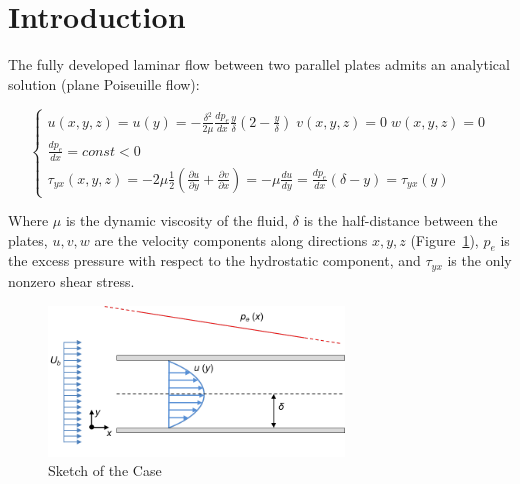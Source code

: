 \documentclass[12pt]{article}
\begin{document}
\maketitle

\begin{abstract} 
        The first test case is the steady-state development of incompressible flow between two parallel plates in the laminar regime (Figure~\\\ref{fig:sketch}). The plates are considered infinite in the direction transversal to the flow. The flow develops from a condition of uniform velocity (rectangular profile) imposed at the inlet boundary, reaching a fully-developed state at a certain distance downstream of it. \cite{FL:01}
\end{abstract}

\section{Introduction}
        The fully developed laminar flow between two parallel plates admits an analytical solution (plane Poiseuille flow):

        \begin{equation}
                \begin{cases}
                        u(x,y,z) = u(y) = - \frac{\delta ^ 2}{2 \mu} \frac{dp_e}{dx} \frac{y}{\delta} (2 - \frac{y}{\delta}) \; v(x,y,z) = 0 \; w(x,y,z) = 0 \\
                        \frac{dp_e}{dx} = const < 0 \\
                        \tau_{yx}(x,y,z) = - 2 \mu \frac{1}{2} \left( \frac{\partial u}{\partial y} + \frac{\partial v}{\partial x} \right) = - \mu \frac{du}{dy} = \frac{dp_e}{dx} (\delta - y) = \tau_{yx}(y)
                \end{cases}
        \end{equation}

        Where \( \mu \) is the dynamic viscosity of the fluid, \( \delta \) is the half-distance between the plates, \(u, v, w\) are the velocity components along directions \( x, y, z \) (Figure~\ref{fig:sketch}), \( p_e \) is the excess pressure with respect to the hydrostatic component, and \( \tau_{yx} \) is the only nonzero shear stress. \cite{FL:01}

        \begin{figure}[!ht]
                \includegraphics[width=0.7\textwidth]{Case_Sketch.png}
                \centering
                \caption{Sketch of the Case}
                \label{fig:sketch}
        \end{figure}
\end{document}
